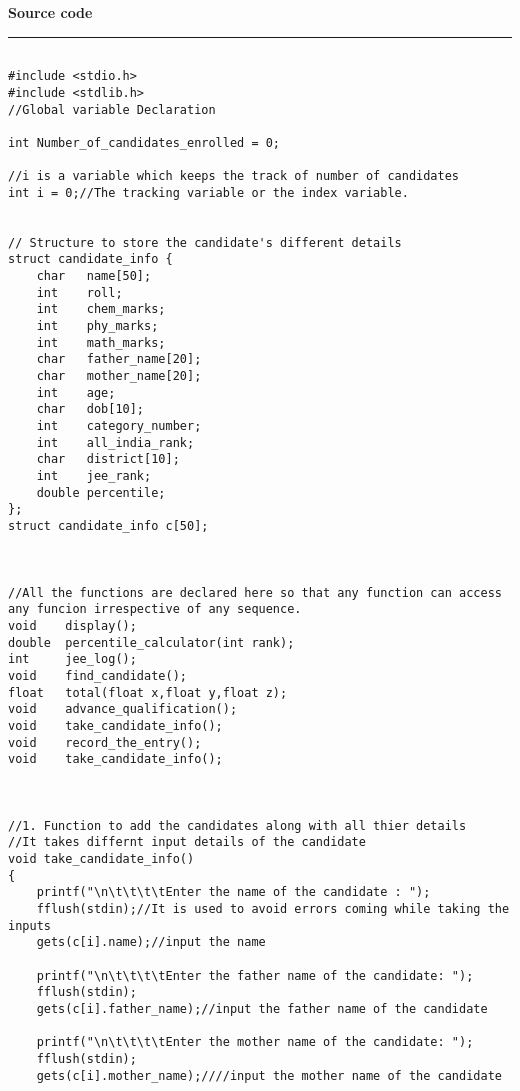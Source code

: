\documentclass{article}
\begin{document}
    
\pagebreak


\vspace{5mm}
\begin{center}
{\Large\textbf{Source code}}
\end{center}
\par\noindent\rule{\textwidth}{0.4pt}


\begin{FlushLeft}


\begin{verbatim}

#include <stdio.h>
#include <stdlib.h>
//Global variable Declaration

int Number_of_candidates_enrolled = 0;

//i is a variable which keeps the track of number of candidates
int i = 0;//The tracking variable or the index variable.


// Structure to store the candidate's different details
struct candidate_info {
    char   name[50];
    int    roll;
    int    chem_marks;
    int    phy_marks;
    int    math_marks;
    char   father_name[20];
    char   mother_name[20];
    int    age;
    char   dob[10];
    int    category_number;
    int    all_india_rank;
    char   district[10];
    int    jee_rank;
    double percentile;
};
struct candidate_info c[50];



//All the functions are declared here so that any function can access any funcion irrespective of any sequence.
void    display();
double  percentile_calculator(int rank);
int     jee_log();
void    find_candidate();
float   total(float x,float y,float z);
void    advance_qualification();
void    take_candidate_info();
void    record_the_entry();
void    take_candidate_info();



//1. Function to add the candidates along with all thier details
//It takes differnt input details of the candidate
void take_candidate_info()
{
    printf("\n\t\t\t\tEnter the name of the candidate : ");
    fflush(stdin);//It is used to avoid errors coming while taking the inputs
    gets(c[i].name);//input the name

    printf("\n\t\t\t\tEnter the father name of the candidate: ");
    fflush(stdin);
    gets(c[i].father_name);//input the father name of the candidate

    printf("\n\t\t\t\tEnter the mother name of the candidate: ");
    fflush(stdin);
    gets(c[i].mother_name);////input the mother name of the candidate


\end{verbatim}
\end{FlushLeft}
\end{document}
